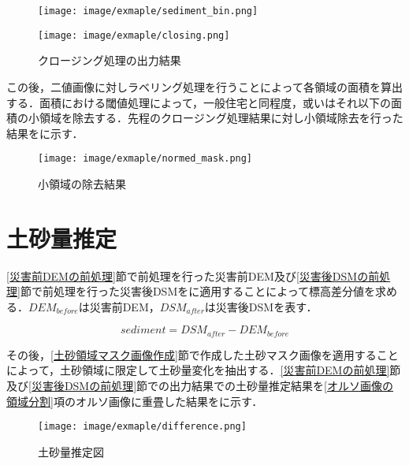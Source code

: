       \begin{figure}[t]
        \begin{minipage}[c]{0.45\hsize}
          \centering
          \texttt{[image: image/exmaple/sediment\_bin.png]}
        \end{minipage}
        \begin{minipage}[c]{0.45\hsize}
          \centering
          \texttt{[image: image/exmaple/closing.png]}
        \end{minipage}
        \caption{クロージング処理の出力結果}
        \label{クロージング処理}
      \end{figure}

      この後，二値画像に対しラベリング処理を行うことによって各領域の面積を算出する．面積における閾値処理によって，一般住宅と同程度，或いはそれ以下の面積の小領域を除去する．先程のクロージング処理結果に対し小領域除去を行った結果をに示す．
      
      \begin{figure}[t]
        \centering
        \texttt{[image: image/exmaple/normed\_mask.png]}
        \caption{小領域の除去結果}
        \label{小領域除去}
      \end{figure}



  \section{土砂量推定}
    \label{土砂量推定}
    \ref{災害前DEMの前処理}節で前処理を行った災害前DEM及び\ref{災害後DSMの前処理}節で前処理を行った災害後DSMをに適用することによって標高差分値を求める．$DEM_{before}$は災害前DEM，$DSM_{after}$は災害後DSMを表す．
    
    \begin{equation}
      \label{土砂量推定式}
      sediment = DSM_{after} - DEM_{before}
    \end{equation}

    その後，\ref{土砂領域マスク画像作成}節で作成した土砂マスク画像を適用することによって，土砂領域に限定して土砂量変化を抽出する．\ref{災害前DEMの前処理}節及び\ref{災害後DSMの前処理}節での出力結果での土砂量推定結果を\ref{オルソ画像の領域分割}項のオルソ画像に重畳した結果をに示す．

    \begin{figure}[t]
      \centering
      \texttt{[image: image/exmaple/difference.png]}
      \caption{土砂量推定図}
      \label{土砂量推定結果}
    \end{figure}




